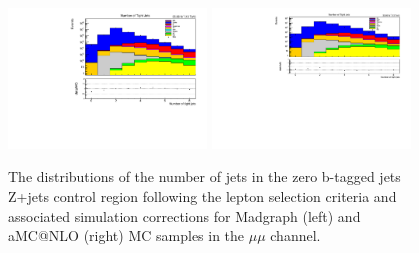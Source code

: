 \begin{figure}[tbp]
\centering
\includegraphics[width=0.47\textwidth]{figs/background-estimation/plots/unblinded/DY_control_old_prompt_mumu_ttbarInc/nJets_lepSel.pdf}
\includegraphics[width=0.47\textwidth]{figs/background-estimation/plots/unblinded/DY_control_old_prompt_mumu_DYamcatnlo_noSF/nJets_lepSel.pdf}
\caption{
The distributions of the number of jets in the zero b-tagged jets Z+jets control region following the lepton selection criteria and associated simulation corrections for Madgraph (left) and aMC@NLO (right) MC samples in the $\mu\mu$ channel.
}
\label{fig:zPlusCR_nJets}
\end{figure}

